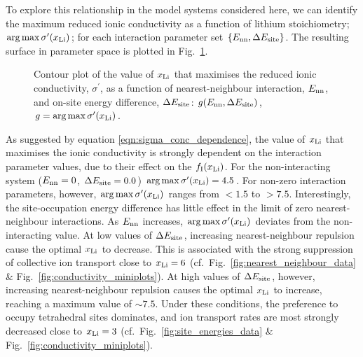 \documentclass[aps,prb,twocolumn,superscriptaddress,reprint]{revtex4-1}
\newcommand{\set}[1]{\left\{#1\right\}}
\newcommand{\xLi}{x_\m{Li}}
\begin{document}
To explore this relationship in the model systems considered here, we can identify the maximum reduced ionic conductivity as a function of lithium stoichiometry; $\arg\max \sigma^\prime(\xLi)$; for each interaction parameter set $\set{E_\m{nn}, \Delta E_\m{site}}$. The resulting surface in parameter space is plotted in Fig.\ \ref{fig:max_sigma}.
\begin{figure}[tb]
  \centering
    \caption{\label{fig:max_sigma}Contour plot of the value of $\xLi$ that maximises the reduced ionic conductivity, $\sigma^\prime$, as a function of nearest-neighbour interaction, $E_{\mathrm{nn}}$, and on-site energy difference, $\Delta E_{\mathrm{site}}$: $g(E_{\mathrm{nn}}, \Delta E_{\mathrm{site}})$, $g = \arg \max \sigma^\prime(\xLi)$.}
\end{figure}
As suggested by equation \ref{eqn:sigma_conc_dependence}, the value of $\xLi$ that maximises the ionic conductivity is strongly dependent on the interaction parameter values, due to their effect on the $f_\m{I}(\xLi)$. For the non-interacting system ($E_{\mathrm{nn}}=0$, $\Delta E_{\mathrm{site}}=0.0$) $\arg \max \sigma^\prime(\xLi)=4.5$. For non-zero interaction parameters, however, $\arg \max \sigma^\prime(\xLi)$ ranges from $<1.5$ to $>7.5$. Interestingly, the site-occupation energy difference has little effect in the limit of zero nearest-neighbour interactions. As $E_{\mathrm{nn}}$ increases, $\arg \max \sigma^\prime(\xLi)$ deviates from the non-interacting value. At low values of $\Delta E_{\mathrm{site}}$, increasing nearest-neighbour repulsion cause the optimal $\xLi$ to decrease. This is associated with the strong suppression of collective ion transport close to $\xLi=6$ (cf.\ Fig.~\ref{fig:nearest_neighbour_data} \& Fig.~\ref{fig:conductivity_miniplots}). At high values of $\Delta E_{\mathrm{site}}$, however, increasing nearest-neighbour repulsion causes the optimal $\xLi$ to increase, reaching a maximum value of $\sim7.5$. Under these conditions, the preference to occupy tetrahedral sites dominates, and ion transport rates are most strongly decreased close to $\xLi=3$ (cf.\ Fig.~\ref{fig:site_energies_data} \& Fig.~\ref{fig:conductivity_miniplots}).
\end{document}
